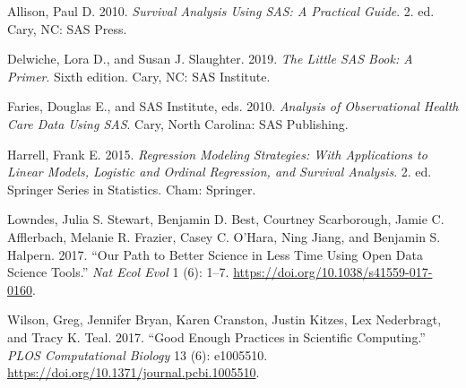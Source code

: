\documentclass[
  letterpaper,
  DIV=11,
  numbers=noendperiod]{scrreprt}
\newlength{\cslhangindent}
\newlength{\cslentryspacingunit} %
\newenvironment{CSLReferences}[2] %
 {%
  \setlength{\parindent}{0pt}
  \ifodd #1
  \let\oldpar\par
  \def\par{\hangindent=\cslhangindent\oldpar}
  \fi
  \setlength{\parskip}{#2\cslentryspacingunit}
 }%
 {}
\begin{document}

\hypertarget{refs}{}
\begin{CSLReferences}{1}{0}
\leavevmode{}%
Allison, Paul D. 2010. \emph{Survival Analysis Using {SAS}: A Practical
Guide}. 2. ed. Cary, {NC}: {SAS} Press.

\leavevmode{}%
Delwiche, Lora D., and Susan J. Slaughter. 2019. \emph{The Little {SAS}
Book: A Primer}. Sixth edition. Cary, {NC}: {SAS} Institute.

\leavevmode{}%
Faries, Douglas E., and SAS Institute, eds. 2010. \emph{Analysis of
Observational Health Care Data Using {SAS}}. Cary, North Carolina: {SAS}
Publishing.

\leavevmode{}%
Harrell, Frank E. 2015. \emph{Regression Modeling Strategies: With
Applications to Linear Models, Logistic and Ordinal Regression, and
Survival Analysis}. 2. ed. Springer Series in Statistics. Cham:
Springer.

\leavevmode{}%
Lowndes, Julia S. Stewart, Benjamin D. Best, Courtney Scarborough, Jamie
C. Afflerbach, Melanie R. Frazier, Casey C. O'Hara, Ning Jiang, and
Benjamin S. Halpern. 2017. {``Our Path to Better Science in Less Time
Using Open Data Science Tools.''} \emph{Nat Ecol Evol} 1 (6): 1--7.
\url{https://doi.org/10.1038/s41559-017-0160}.

\leavevmode{}%
Wilson, Greg, Jennifer Bryan, Karen Cranston, Justin Kitzes, Lex
Nederbragt, and Tracy K. Teal. 2017. {``Good Enough Practices in
Scientific Computing.''} \emph{{PLOS} Computational Biology} 13 (6):
e1005510. \url{https://doi.org/10.1371/journal.pcbi.1005510}.

\end{CSLReferences}
\end{document}

